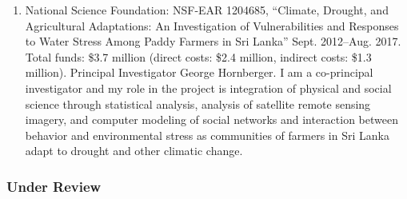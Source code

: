 \begin{enumerate}
	\item National Science Foundation: NSF-EAR 1204685, ``Climate, Drought, and Agricultural Adaptations: An Investigation of Vulnerabilities and Responses to Water Stress Among Paddy Farmers in Sri Lanka'' Sept. 2012--Aug. 2017. Total funds: \$3.7 million (direct costs: \$2.4 million, indirect costs: \$1.3 million). Principal Investigator George Hornberger. I am a co-principal investigator and my role in the project is integration of physical and social science through statistical analysis, analysis of satellite remote sensing imagery, and computer modeling of social networks and interaction between behavior and environmental stress as communities of farmers in Sri Lanka adapt to drought and other climatic change.
\end{enumerate}
\iffalse
\subsubsection{Under Review}
